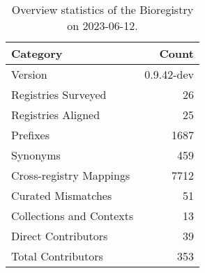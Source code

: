 \begin{table}
\caption{Overview statistics of the Bioregistry on 2023-06-12.}
\label{tab:bioregistry-summary}
\begin{tabular}{lr}
\toprule
Category & Count \\
\midrule
Version & 0.9.42-dev \\
Registries Surveyed & 26 \\
Registries Aligned & 25 \\
Prefixes & 1687 \\
Synonyms & 459 \\
Cross-registry Mappings & 7712 \\
Curated Mismatches & 51 \\
Collections and Contexts & 13 \\
Direct Contributors & 39 \\
Total Contributors & 353 \\
\bottomrule
\end{tabular}
\end{table}
